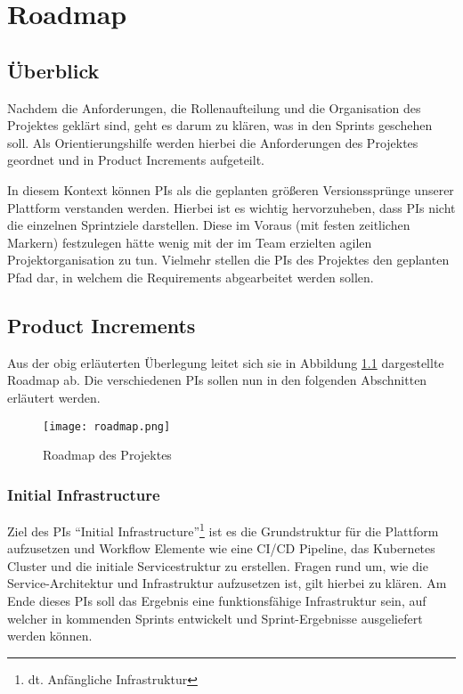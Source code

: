 
\chapter{Roadmap}

\section{Überblick}
Nachdem die Anforderungen, die Rollenaufteilung und die Organisation des Projektes geklärt sind, geht es darum zu klären, was in den Sprints geschehen soll.
Als Orientierungshilfe werden hierbei die Anforderungen des Projektes geordnet und in Product Increments aufgeteilt.

In diesem Kontext können \acp{PI} als die geplanten größeren Versionssprünge unserer Plattform verstanden werden.
Hierbei ist es wichtig hervorzuheben, dass \acp{PI} nicht die einzelnen Sprintziele darstellen.
Diese im Voraus (mit festen zeitlichen Markern) festzulegen hätte wenig mit der im Team erzielten agilen Projektorganisation zu tun.
Vielmehr stellen die \acp{PI} des Projektes den geplanten Pfad dar, in welchem die Requirements abgearbeitet werden sollen.

\section{Product Increments}
Aus der obig erläuterten Überlegung leitet sich sie in Abbildung \ref{fig:roadmap} dargestellte Roadmap ab.
Die verschiedenen \acp{PI} sollen nun in den folgenden Abschnitten erläutert werden.

\begin{figure}
    \centering
    \texttt{[image: roadmap.png]}
    \caption{Roadmap des Projektes}
    \label{fig:roadmap}
\end{figure}

\subsection{Initial Infrastructure} \label{initial_infra}
Ziel des \acp{PI} \enquote{Initial Infrastructure}\footnote{dt. Anfängliche Infrastruktur} ist es die Grundstruktur für die Plattform aufzusetzen und Workflow Elemente wie eine \ac{CI/CD} Pipeline, das Kubernetes Cluster und die initiale Servicestruktur zu erstellen.
Fragen rund um, wie die Service-Architektur und Infrastruktur aufzusetzen ist, gilt hierbei zu klären.
Am Ende dieses \acp{PI} soll das Ergebnis eine funktionsfähige Infrastruktur sein, auf welcher in kommenden Sprints entwickelt und Sprint-Ergebnisse ausgeliefert werden können.

